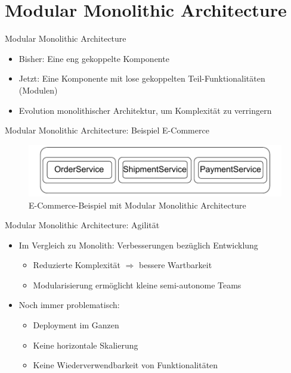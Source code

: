 \section{Modular Monolithic Architecture}

\begin{frame}{Modular Monolithic Architecture}
    \begin{itemize}
        \item Bisher: Eine eng gekoppelte Komponente
        \item Jetzt: Eine Komponente mit lose gekoppelten Teil-Funktionalitäten (Modulen)
        \item Evolution monolithischer Architektur, um Komplexität zu verringern \cite{modular}
    \end{itemize}
\end{frame}

\begin{frame}{Modular Monolithic Architecture: Beispiel E-Commerce}
    \begin{figure}[!h]
        \centering
        \includegraphics[scale=0.70]{imglib/mono/mono-example}
        \caption{E-Commerce-Beispiel mit Modular Monolithic Architecture}
        \label{fig:mono-modular}
    \end{figure}
\end{frame}

\begin{frame}{Modular Monolithic Architecture: Agilität}
    \begin{itemize}
        \item Im Vergleich zu Monolith: Verbesserungen bezüglich Entwicklung
        \begin{itemize}
            \item Reduzierte Komplexität $\Rightarrow$ bessere Wartbarkeit
            \item Modularisierung ermöglicht kleine semi-autonome Teams
        \end{itemize}
        \item Noch immer problematisch:
        \begin{itemize}
            \item Deployment im Ganzen
            \item Keine horizontale Skalierung
            \item Keine Wiederverwendbarkeit von Funktionalitäten
        \end{itemize}
    \end{itemize}
\end{frame}
